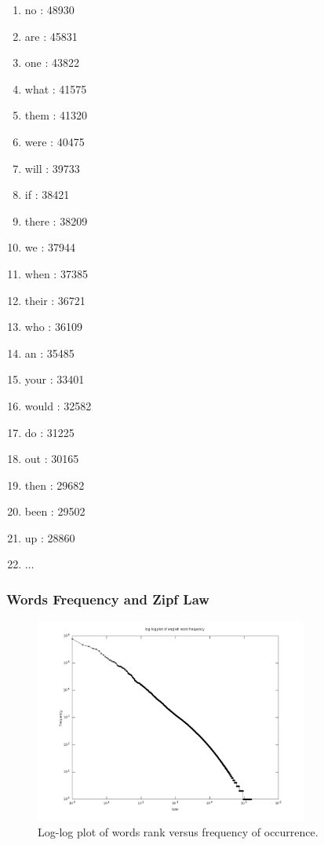 \documentclass[notes]{beamer}
\begin{document}
{\begin{tiny}
\begin{multicols}{4}
\begin{enumerate}
	\item no : 48930
	\item are : 45831
	\item one : 43822
	\item what : 41575
	\item them : 41320
	\item were : 40475
	\item will : 39733
	\item if : 38421
	\item there : 38209
	\item we : 37944
	\item when : 37385
	\item their : 36721
	\item who : 36109
	\item an : 35485
	\item your : 33401
	\item would : 32582
	\item do : 31225
	\item out : 30165
	\item then : 29682
	\item been : 29502
	\item up : 28860
	\item[] $\ldots$
\end{enumerate}
\end{multicols}
\end{tiny}
}


\frame
{
  \frametitle{Words Frequency and Zipf Law}
  \vspace{-0.25cm}
  \begin{figure}[h!]
  \centering
  \includegraphics[width=0.8\textwidth]{images/wordfrequency_en.png}
  \vspace{-0.6cm}
  \caption{Log-log plot of words rank versus frequency of occurrence.}
  \label{fig:wordfrequency_en}
  \end{figure} 
}
\end{document}
